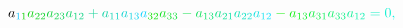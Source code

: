 \documentclass[12pt]{article}
\begin{document}
\begin{displaymath}
{a} _ { \mathcolor[RGB]{15,195,255}{1} \mathcolor[RGB]{15,210,0}{1} } \mathcolor[RGB]{15,210,15}{a} _ { \mathcolor[RGB]{15,210,30}{2} \mathcolor[RGB]{15,210,45}{2} } \mathcolor[RGB]{15,210,60}{a} _ { \mathcolor[RGB]{15,210,75}{2} \mathcolor[RGB]{15,210,90}{3} } \mathcolor[RGB]{15,210,105}{a} _ { \mathcolor[RGB]{15,210,120}{1} \mathcolor[RGB]{15,210,135}{2} } \mathcolor[RGB]{15,210,150}{+} \mathcolor[RGB]{15,210,165}{a} _ { \mathcolor[RGB]{15,210,180}{1} \mathcolor[RGB]{15,210,195}{1} } \mathcolor[RGB]{15,210,210}{a} _ { \mathcolor[RGB]{15,210,225}{1} \mathcolor[RGB]{15,210,240}{3} } \mathcolor[RGB]{15,210,255}{a} _ { \mathcolor[RGB]{15,225,0}{3} \mathcolor[RGB]{15,225,15}{2} } \mathcolor[RGB]{15,225,30}{a} _ { \mathcolor[RGB]{15,225,45}{3} \mathcolor[RGB]{15,225,60}{3} } \mathcolor[RGB]{15,225,75}{-} \mathcolor[RGB]{15,225,90}{a} _ { \mathcolor[RGB]{15,225,105}{1} \mathcolor[RGB]{15,225,120}{3} } \mathcolor[RGB]{15,225,135}{a} _ { \mathcolor[RGB]{15,225,150}{2} \mathcolor[RGB]{15,225,165}{1} } \mathcolor[RGB]{15,225,180}{a} _ { \mathcolor[RGB]{15,225,195}{2} \mathcolor[RGB]{15,225,210}{2} } \mathcolor[RGB]{15,225,225}{a} _ { \mathcolor[RGB]{15,225,240}{1} \mathcolor[RGB]{15,225,255}{2} } \mathcolor[RGB]{15,240,0}{-} \mathcolor[RGB]{15,240,15}{a} _ { \mathcolor[RGB]{15,240,30}{1} \mathcolor[RGB]{15,240,45}{3} } \mathcolor[RGB]{15,240,60}{a} _ { \mathcolor[RGB]{15,240,75}{3} \mathcolor[RGB]{15,240,90}{1} } \mathcolor[RGB]{15,240,105}{a} _ { \mathcolor[RGB]{15,240,120}{3} \mathcolor[RGB]{15,240,135}{3} } \mathcolor[RGB]{15,240,150}{a} _ { \mathcolor[RGB]{15,240,165}{1} \mathcolor[RGB]{15,240,180}{2} } \mathcolor[RGB]{15,240,195}{=} \mathcolor[RGB]{15,240,210}{0} \mathcolor[RGB]{15,240,225}{,} \,
\end{displaymath}
\end{document}
